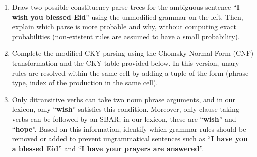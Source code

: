 \documentclass{../extra/aakpract/aakpract}
\begin{document}
	\begin{enumerate}
		\item Draw two possible constituency parse trees for the ambiguous sentence ``\textbf{I wish you blessed Eid}'' using the unmodified grammar on the left. 
		Then, explain which parse is more probable and why, without computing exact probabilities (non-existent rules are assumed to have a small probability).
		
		\item Complete the modified CKY parsing using the Chomsky Normal Form (CNF) transformation and the CKY table provided below.
		In this version, unary rules are resolved within the same cell by adding a tuple of the form (phrase type, index of the production in the same cell).
		
		\item Only ditransitive verbs can take two noun phrase arguments, and in our lexicon, only ``\textbf{wish}'' satisfies this condition. 
		Moreover, only clause-taking verbs can be followed by an SBAR; in our lexicon, these are ``\textbf{wish}'' and ``\textbf{hope}''. 
		Based on this information, identify which grammar rules should be removed or added to prevent ungrammatical sentences such as ``\textbf{I have you a blessed Eid}'' and ``\textbf{I have your prayers are answered}''.
	\end{enumerate}
	
\end{document}
